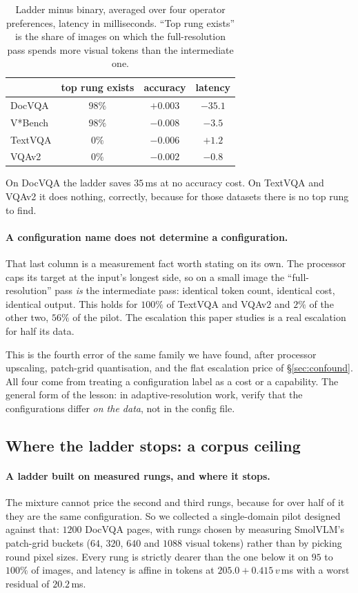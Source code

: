 \documentclass[10pt,twocolumn]{article}
\theoremstyle{plain}
\begin{document}
\begin{table}[t]
\centering\small
\setlength{\tabcolsep}{4pt}
\begin{tabular}{lccc}
\toprule
 & top rung exists & accuracy & latency \\
\midrule
DocVQA  & $98\%$ & $+0.003$ & $\mathbf{-35.1}$ \\
V*Bench & $98\%$ & $-0.008$ & $-3.5$ \\
TextVQA & $0\%$  & $-0.006$ & $+1.2$ \\
VQAv2   & $0\%$  & $-0.002$ & $-0.8$ \\
\bottomrule
\end{tabular}
\caption{Ladder minus binary, averaged over four operator preferences, latency
in milliseconds. ``Top rung exists'' is the share of images on which the
full-resolution pass spends more visual tokens than the intermediate one.}
\label{tab:ladder}
\end{table}

On DocVQA the ladder saves $35$\,ms at no accuracy cost. On TextVQA and VQAv2 it
does nothing, correctly, because for those datasets there is no top rung to
find.

\paragraph{A configuration name does not determine a configuration.} That last
column is a measurement fact worth stating on its own. The processor caps its
target at the input's longest side, so on a small image the ``full-resolution''
pass \emph{is} the intermediate pass: identical token count, identical cost,
identical output. This holds for $100\%$ of TextVQA and VQAv2 and $2\%$ of the
other two, $56\%$ of the pilot. The escalation this paper studies is a real
escalation for half its data.

This is the fourth error of the same family we have found, after processor
upscaling, patch-grid quantisation, and the flat escalation price of
\S\ref{sec:confound}. All four come from treating a configuration label as a
cost or a capability. The general form of the lesson: in adaptive-resolution
work, verify that the configurations differ \emph{on the data}, not in the
config file.

\subsection{Where the ladder stops: a corpus ceiling}

\paragraph{A ladder built on measured rungs, and where it stops.} The mixture
cannot price the second and third rungs, because for over half of it they are
the same configuration. So we collected a single-domain pilot designed against
that: $1200$ DocVQA pages, with rungs chosen by measuring SmolVLM's patch-grid
buckets ($64$, $320$, $640$ and $1088$ visual tokens) rather than by picking
round pixel sizes. Every rung is strictly dearer than the one below it on
$95$ to $100\%$ of images, and latency is affine in tokens at
$205.0 + 0.415\,v$\,ms with a worst residual of $20.2$\,ms.
\end{document}
